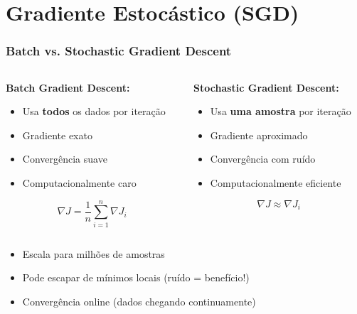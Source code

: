 \documentclass[xcolor=dvipsnames,t,aspectratio=169]{beamer} %
\begin{document}
\section{Gradiente Estocástico (SGD)}
\begin{frame}
    \frametitle{Batch vs. Stochastic Gradient Descent}
    
    \begin{columns}[c]
        \begin{column}{0.5\textwidth}
            \textbf{Batch Gradient Descent:}
            \begin{itemize}
                \item Usa \textbf{todos} os dados por iteração
                \item Gradiente exato
                \item Convergência suave
                \item Computacionalmente caro
            \end{itemize}
            
            \begin{equation}
                \nabla J = \frac{1}{n}\sum_{i=1}^{n} \nabla J_i
            \end{equation}
        \end{column}
        \begin{column}{0.5\textwidth}
            \textbf{Stochastic Gradient Descent:}
            \begin{itemize}
                \item Usa \textbf{uma amostra} por iteração
                \item Gradiente aproximado
                \item Convergência com ruído
                \item Computacionalmente eficiente
            \end{itemize}
            
            \begin{equation}
                \nabla J \approx \nabla J_i
            \end{equation}
        \end{column}
    \end{columns}

    \begin{display}
        \begin{itemize}
            \item Escala para milhões de amostras
            \item Pode escapar de mínimos locais (ruído = benefício!)
            \item Convergência online (dados chegando continuamente)
        \end{itemize}
    \end{display}
\end{frame}
\end{document}
